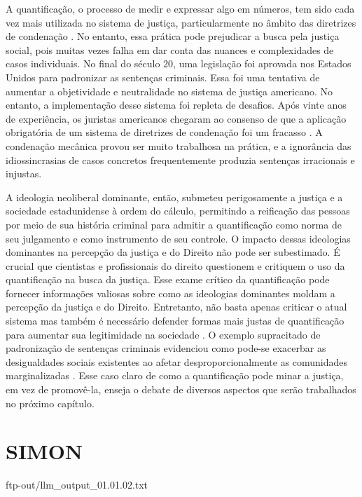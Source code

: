 A quantificação, o processo de medir e expressar algo em números, tem sido cada vez mais utilizada no sistema de justiça, particularmente no âmbito das diretrizes de condenação \cite{salais2016quantification}. No entanto, essa prática pode prejudicar a busca pela justiça social, pois muitas vezes falha em dar conta das nuances e complexidades de casos individuais. No final do século 20, uma legislação foi aprovada nos Estados Unidos para padronizar as sentenças criminais. Essa foi uma tentativa de aumentar a objetividade e neutralidade no sistema de justiça americano. No entanto, a implementação desse sistema foi repleta de desafios. Após vinte anos de experiência, os juristas americanos chegaram ao consenso de que a aplicação obrigatória de um sistema de diretrizes de condenação foi um fracasso \cite{espeland2008sociology}. A condenação mecânica provou ser muito trabalhosa na prática, e a ignorância das idiossincrasias de casos concretos frequentemente produzia sentenças irracionais e injustas.

A ideologia neoliberal dominante, então, submeteu perigosamente a justiça e a sociedade estadunidense à ordem do cálculo, permitindo a reificação das pessoas por meio de sua história criminal para admitir a quantificação como norma de seu julgamento e como instrumento de seu controle. O impacto dessas ideologias dominantes na percepção da justiça e do Direito não pode ser subestimado. É crucial que cientistas e profissionais do direito questionem e critiquem o uso da quantificação na busca da justiça. Esse exame crítico da quantificação pode fornecer informações valiosas sobre como as ideologias dominantes moldam a percepção da justiça e do Direito. Entretanto, não basta apenas criticar o atual sistema mas também é necessário defender formas mais justas de quantificação para aumentar sua legitimidade na sociedade \cite{camargo2022estado}. O exemplo supracitado de padronização de sentenças criminais evidenciou como pode-se exacerbar as desigualdades sociais existentes ao afetar desproporcionalmente as comunidades marginalizadas \cite{lynch2019narrative}. Esse caso claro de como a quantificação pode minar a justiça, em vez de promovê-la, enseja o debate de diversos aspectos que serão trabalhados no próximo capítulo.

\section{SIMON}


ftp-out/llm_output_01.01.02.txt 

